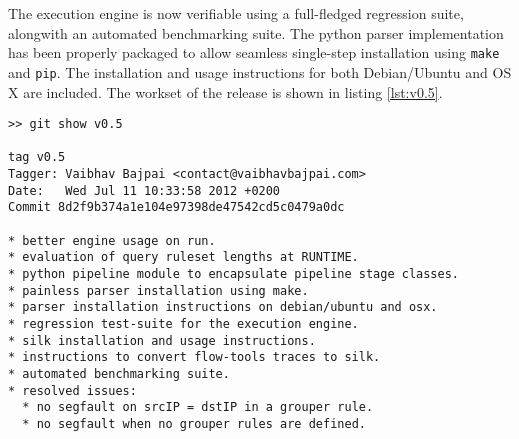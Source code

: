 The execution engine is now verifiable using a full-fledged regression suite,
alongwith an automated benchmarking suite. The python parser  implementation has been properly packaged to allow seamless
single-step installation using \texttt{make} and \texttt{pip}. The
installation and usage instructions for both Debian/Ubuntu and OS X are
included.  The workset of the release is shown in listing \ref{lst:v0.5}.

\begin{lstlisting}
>> git show v0.5

tag v0.5
Tagger: Vaibhav Bajpai <contact@vaibhavbajpai.com>
Date:   Wed Jul 11 10:33:58 2012 +0200
Commit 8d2f9b374a1e104e97398de47542cd5c0479a0dc

* better engine usage on run.
* evaluation of query ruleset lengths at RUNTIME.
* python pipeline module to encapsulate pipeline stage classes.
* painless parser installation using make.
* parser installation instructions on debian/ubuntu and osx.
* regression test-suite for the execution engine.
* silk installation and usage instructions.
* instructions to convert flow-tools traces to silk.
* automated benchmarking suite.
* resolved issues:
  * no segfault on srcIP = dstIP in a grouper rule.
  * no segfault when no grouper rules are defined.
\end{lstlisting}
